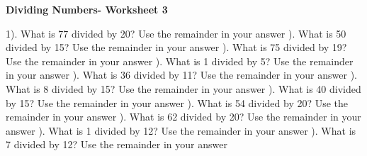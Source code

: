 \documentclass{article}%
\begin{document}
\newline%
\newline%
\newline%
\pagebreak%
\large%
\begin{center}%
\textbf{Dividing Numbers- Worksheet 3}%
\newline%
\end{center} \normalsize%
1). What is 77 divided by 20? Use the remainder in your answer%
\newline%
\newline%
). What is 50 divided by 15? Use the remainder in your answer%
\newline%
\newline%
). What is 75 divided by 19? Use the remainder in your answer%
\newline%
\newline%
). What is 1 divided by 5? Use the remainder in your answer%
\newline%
\newline%
). What is 36 divided by 11? Use the remainder in your answer%
\newline%
\newline%
). What is 8 divided by 15? Use the remainder in your answer%
\newline%
\newline%
). What is 40 divided by 15? Use the remainder in your answer%
\newline%
\newline%
). What is 54 divided by 20? Use the remainder in your answer%
\newline%
\newline%
). What is 62 divided by 20? Use the remainder in your answer%
\newline%
\newline%
). What is 1 divided by 12? Use the remainder in your answer%
\newline%
\newline%
). What is 7 divided by 12? Use the remainder in your answer%
\newline%
\end{document}
